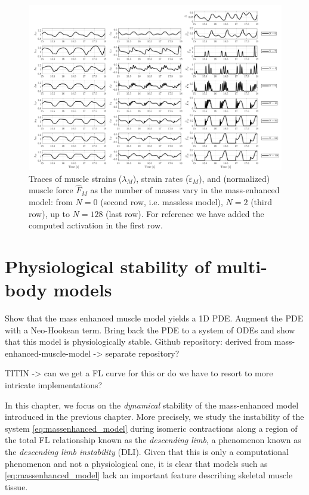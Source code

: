 \documentclass{sfuthesis}
\numberwithin{equation}{chapter}
\numberwithin{figure}{chapter}
\numberwithin{table}{chapter}
\theoremstyle{definition}
\newcommand{\depsilon}{\dot{\varepsilon}}
\begin{document}
\begin{figure}
    \centering
    \hspace*{-3.5em}\includegraphics[width=1.2\textwidth]{multibody-homog-study.png}
    \caption{Traces of muscle strains ($\lambda_M$), strain rates ($\depsilon_M$), and (normalized) muscle force $\widehat{F}_M$ as the number of masses vary in the mass-enhanced model: from $N=0$ (second row, i.e. massless model), $N=2$ (third row), up to $N=128$ (last row). For reference we have added the computed activation in the first row.}
    \label{fig:multibody-homog-study}
\end{figure}


\chapter{Physiological stability of multi-body models}

Show that the mass enhanced muscle model yields a 1D PDE. Augment the PDE with a Neo-Hookean term. Bring back the PDE to a system of ODEs and show that this model is physiologically stable.
Github repository: derived from mass-enhanced-muscle-model -> separate repository?

\medskip

TITIN -> can we get a FL curve for this or do we have to resort to more intricate implementations?

\hrulefill

In this chapter, we focus on the \textit{dynamical} stability of the mass-enhanced model introduced in the previous chapter. More precisely, we study the instability of the system \eqref{eq:massenhanced_model} during isomeric contractions along a region of the total FL relationship known as the \textit{descending limb}, a phenomenon known as the \textit{descending limb instability} (DLI). Given that this is only a computational phenomenon and not a physiological one, it is clear that models such as \eqref{eq:massenhanced_model} lack an important feature describing skeletal muscle tissue. 
\end{document}

